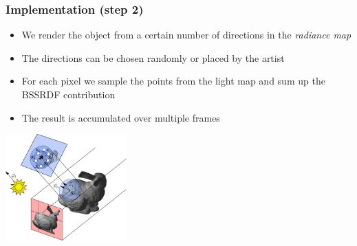 \documentclass{beamer}
\begin{document}
\begin{frame}
    \frametitle{Implementation (step 2)}
			\begin{itemize}
			\item We render the object from a certain number of directions in the \emph{radiance map}
			\item The directions can be chosen randomly or placed by the artist
			\item For each pixel we sample the points from the light map and sum up the BSSRDF contribution
			\item The result is accumulated over multiple frames
			\end{itemize}
			\centering
			\includegraphics[width=0.35\textwidth]{step2.jpg} 
\end{frame}
\end{document}
